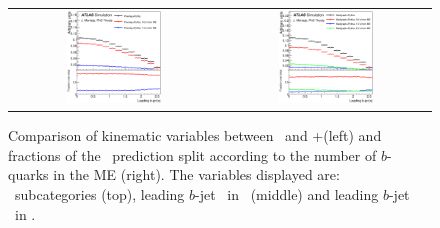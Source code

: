 \begin{figure}[tp]
\begin{tabular}{cc}
  \includegraphics[width=0.47\textwidth]{Modeling/Figures/mepspp_tt2bq_q1_eta.eps} & 
  \includegraphics[width=0.47\textwidth]{Modeling/Figures/meps_tt2bq_q1_eta.eps} \\
\end{tabular}
  \caption{Comparison of kinematic variables between \PP\ and \madgraph+\pythia (left) and fractions of the \madgraph\ prediction split according to the number of $b$-quarks in the ME (right). 
  The variables displayed are: \ttbb\ subcategories (top), leading $b$-jet \pt\ in \ttbb\ (middle) and leading $b$-jet \eta\ in \ttbb.}
  \label{fig:mgpp_splitME_1}
\end{figure}
